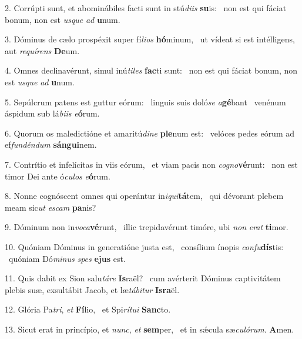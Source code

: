 2. Corrúpti sunt, et abominábiles facti sunt in stú\textit{di}\textit{is} \textbf{su}is: \ast\  non est qui fáciat bonum, non est \textit{us}\textit{que} \textit{ad} \textbf{u}num.\

3. Dóminus de cælo prospéxit super fí\textit{li}\textit{os} \textbf{hó}minum, \ast\  ut vídeat si est intélligens, aut \textit{re}\textit{quí}\textit{rens} \textbf{De}um.\

4. Omnes declinavérunt, simul inú\textit{ti}\textit{les} \textbf{fac}ti sunt: \ast\  non est qui fáciat bonum, non est \textit{us}\textit{que} \textit{ad} \textbf{u}num.\

5. Sepúlcrum patens est guttur eórum: \dag\  linguis suis doló\textit{se} \textit{a}\textbf{gé}bant \ast\  venénum áspidum sub lá\textit{bi}\textit{is} \textit{e}\textbf{ó}rum.\

6. Quorum os maledictióne et amaritú\textit{di}\textit{ne} \textbf{ple}num est: \ast\  velóces pedes eórum ad ef\textit{fun}\textit{dén}\textit{dum} \textbf{sán}\textbf{gui}nem.\

7. Contrítio et infelícitas in viis eórum, \dag\  et viam pacis non \textit{co}\textit{gno}\textbf{vé}runt: \ast\  non est timor Dei ante ó\textit{cu}\textit{los} \textit{e}\textbf{ó}rum.\

8. Nonne cognóscent omnes qui operántur in\textit{i}\textit{qui}\textbf{tá}tem, \ast\  qui dévorant plebem meam sic\textit{ut} \textit{es}\textit{cam} \textbf{pa}nis?\

9. Dóminum non in\textit{vo}\textit{ca}\textbf{vé}runt, \ast\  illic trepidavérunt timóre, ubi \textit{non} \textit{e}\textit{rat} \textbf{ti}mor.\

10. Quóniam Dóminus in generatióne justa est, \dag\  consílium ínopis \textit{con}\textit{fu}\textbf{dís}tis: \ast\  quóniam Dó\textit{mi}\textit{nus} \textit{spes} \textbf{e}\textbf{jus} est.\

11. Quis dabit ex Sion salu\textit{tá}\textit{re} \textbf{Is}raël? \ast\  cum avérterit Dóminus captivitátem plebis suæ, exsultábit Jacob, et læ\textit{tá}\textit{bi}\textit{tur} \textbf{Is}\textbf{ra}ël.\

12. Glória Pa\textit{tri}, \textit{et} \textbf{Fí}lio, \ast\  et Spi\textit{rí}\textit{tu}\textit{i} \textbf{Sanc}to.\

13. Sicut erat in princípio, et \textit{nunc}, \textit{et} \textbf{sem}per, \ast\  et in sǽcula sæ\textit{cu}\textit{ló}\textit{rum}. \textbf{A}men.\


